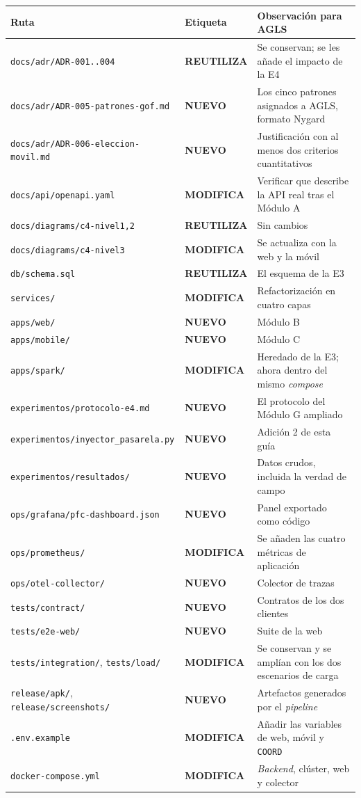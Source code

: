 \documentclass[11pt,a4paper]{article}
\newcommand{\reuso}{\cellcolor{filaReuso}\textbf{REUTILIZA}}
\newcommand{\cambia}{\cellcolor{filaCambia}\textbf{MODIFICA}}
\newcommand{\nuevo}{\cellcolor{filaNuevo}\textbf{NUEVO}}
\begin{document}
\begin{center}
	\footnotesize
	\begin{longtable}{@{}p{5.4cm}p{1.9cm}p{7.5cm}@{}}
		\toprule
		\textbf{Ruta} & \textbf{Etiqueta} & \textbf{Observación para AGLS} \\
		\midrule
		\endhead
		\texttt{docs/adr/ADR-001..004} & \reuso & Se conservan; se les añade el impacto de la E4 \\
		\texttt{docs/adr/ADR-005-\allowbreak patrones-gof.md} & \nuevo & Los cinco patrones asignados a AGLS, formato Nygard \\
		\texttt{docs/adr/ADR-006-\allowbreak eleccion-movil.md} & \nuevo & Justificación con al menos dos criterios cuantitativos \\
		\texttt{docs/api/openapi.yaml} & \cambia & Verificar que describe la API real tras el Módulo A \\
		\texttt{docs/diagrams/c4-nivel1,2} & \reuso & Sin cambios \\
		\texttt{docs/diagrams/c4-nivel3} & \cambia & Se actualiza con la web y la móvil \\
		\texttt{db/schema.sql} & \reuso & El esquema de la E3 \\
		\texttt{services/} & \cambia & Refactorización en cuatro capas \\
		\texttt{apps/web/} & \nuevo & Módulo B \\
		\texttt{apps/mobile/} & \nuevo & Módulo C \\
		\texttt{apps/spark/} & \cambia & Heredado de la E3; ahora dentro del mismo \emph{compose} \\
		\texttt{experimentos/\allowbreak protocolo-e4.md} & \nuevo & El protocolo del Módulo G ampliado \\
		\texttt{experimentos/\allowbreak inyector\_pasarela.py} & \nuevo & Adición 2 de esta guía \\
		\texttt{experimentos/resultados/} & \nuevo & Datos crudos, incluida la verdad de campo \\
		\texttt{ops/grafana/\allowbreak pfc-dashboard.json} & \nuevo & Panel exportado como código \\
		\texttt{ops/prometheus/} & \cambia & Se añaden las cuatro métricas de aplicación \\
		\texttt{ops/otel-collector/} & \nuevo & Colector de trazas \\
		\texttt{tests/contract/} & \nuevo & Contratos de los dos clientes \\
		\texttt{tests/e2e-web/} & \nuevo & Suite de la web \\
		\texttt{tests/integration/},\allowbreak{} \texttt{tests/load/} & \cambia & Se conservan y se amplían con los dos escenarios de carga \\
		\texttt{release/apk/},\allowbreak{} \texttt{release/screenshots/} & \nuevo & Artefactos generados por el \emph{pipeline} \\
		\texttt{.env.example} & \cambia & Añadir las variables de web, móvil y \texttt{COORD} \\
		\texttt{docker-compose.yml} & \cambia & \emph{Backend}, clúster, web y colector \\
		\bottomrule
	\end{longtable}
\end{center}
\end{document}
